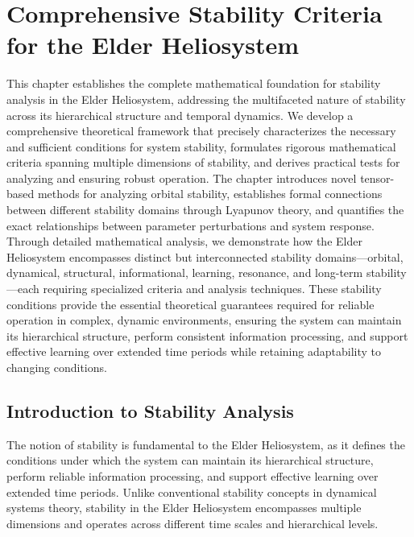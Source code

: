 \chapter{Comprehensive Stability Criteria for the Elder Heliosystem}

\begin{tcolorbox}[colback=blue!5!white,colframe=blue!75!black,title=Chapter Summary]
This chapter establishes the complete mathematical foundation for stability analysis in the Elder Heliosystem, addressing the multifaceted nature of stability across its hierarchical structure and temporal dynamics. We develop a comprehensive theoretical framework that precisely characterizes the necessary and sufficient conditions for system stability, formulates rigorous mathematical criteria spanning multiple dimensions of stability, and derives practical tests for analyzing and ensuring robust operation. The chapter introduces novel tensor-based methods for analyzing orbital stability, establishes formal connections between different stability domains through Lyapunov theory, and quantifies the exact relationships between parameter perturbations and system response. Through detailed mathematical analysis, we demonstrate how the Elder Heliosystem encompasses distinct but interconnected stability domains—orbital, dynamical, structural, informational, learning, resonance, and long-term stability—each requiring specialized criteria and analysis techniques. These stability conditions provide the essential theoretical guarantees required for reliable operation in complex, dynamic environments, ensuring the system can maintain its hierarchical structure, perform consistent information processing, and support effective learning over extended time periods while retaining adaptability to changing conditions.
\end{tcolorbox}

\section{Introduction to Stability Analysis}

The notion of stability is fundamental to the Elder Heliosystem, as it defines the conditions under which the system can maintain its hierarchical structure, perform reliable information processing, and support effective learning over extended time periods. Unlike conventional stability concepts in dynamical systems theory, stability in the Elder Heliosystem encompasses multiple dimensions and operates across different time scales and hierarchical levels.

